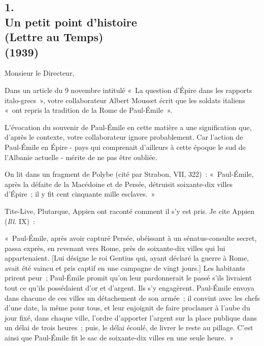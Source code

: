 \documentclass[french,twoside]{book} %
\begin{document}
\subsection[1. Un petit point d'histoire, (Lettre au Temps)  (1939)]{1. \\
Un petit point d'histoire \\
(Lettre au Temps) \protect\footnotemark {\itshape  }\\
(1939)}
\noindent \par
Monsieur le Directeur,\par
Dans un article du 9 novembre intitulé « La question d'Épire dans les rapports italo-grecs », votre collaborateur Albert Mousset écrit que les soldats italiens « ont repris la tradition de la Rome de Paul-Émile ».\par
L'évocation du souvenir de Paul-Émile en cette matière a une signification que, d'après le contexte, votre collaborateur ignore probablement. Car l’action de Paul-Émile en Épire - pays qui comprenait d'ailleurs à cette époque le sud de l'Albanie actuelle - mérite de ne pas être oubliée.\par
On lit dans un fragment de Polybe (cité par Strabon, VII, 322) : « Paul-Émile, après la défaite de la Macédoine et de Persée, détruisit soixante-dix villes d'Épire ; il y fit cent cinquante mille esclaves. »\par
Tite-Live, Plutarque, Appien ont raconté comment il s'y est pris. Je cite Appien ({\itshape Ill.} IX) :\par
« Paul-Émile, après avoir capturé Persée, obéissant à un sénatus-consulte secret, passa exprès, en revenant vers Rome, près de soixante-dix villes qui lui appartenaient. [Lui désigne le roi Gentius qui, ayant déclaré la guerre à Rome, avait été vaincu et pris captif en une campagne de vingt jours.] Les habitants prirent peur ; Paul-Émile promit qu'on leur pardonnerait le passé s'ils livraient tout ce qu'ils possédaient d'or et d'argent. Ils s'y engagèrent. Paul-Émile envoya dans chacune de ces villes un détachement de son armée ; il convint avec les chefs d'une date, la même pour tous, et leur enjoignit de faire proclamer à l'aube du jour fixé, dans chaque ville, l'ordre d'apporter l'argent sur la place publique dans un délai de trois heures ; puis, le délai écoulé, de livrer le reste au pillage. C'est ainsi que Paul-Émile fit le sac de soixante-dix villes en une seule heure. »\par
\end{document}
